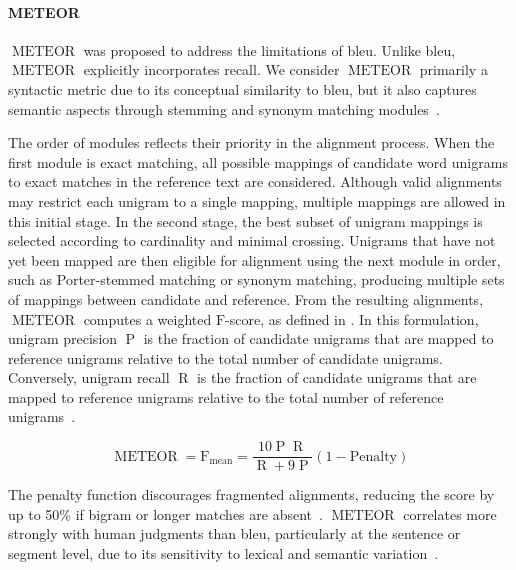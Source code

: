 
\paragraph{METEOR}
$\operatorname{METEOR}$ was proposed to address the limitations of \ac{bleu}. 
Unlike \ac{bleu}, $\operatorname{METEOR}$ explicitly incorporates recall. 
We consider $\operatorname{METEOR}$ primarily a syntactic metric due to its conceptual similarity to \ac{bleu}, but it also captures semantic aspects through stemming and synonym matching modules~\citep{kurt_pehlivanoglu_comparative_2024}. 

The order of modules reflects their priority in the alignment process. 
When the first module is exact matching, all possible mappings of candidate word unigrams to exact matches in the reference text are considered. 
Although valid alignments may restrict each unigram to a single mapping, multiple mappings are allowed in this initial stage. 
In the second stage, the best subset of unigram mappings is selected according to cardinality and minimal crossing. 
Unigrams that have not yet been mapped are then eligible for alignment using the next module in order, such as Porter-stemmed matching or synonym matching, producing multiple sets of mappings between candidate and reference. 
From the resulting alignments, $\operatorname{METEOR}$ computes a weighted $\mathrm{F}$-score, as defined in . 
In this formulation, unigram precision $\operatorname{P}$ is the fraction of candidate unigrams that are mapped to reference unigrams relative to the total number of candidate unigrams. 
Conversely, unigram recall $\operatorname{R}$ is the fraction of candidate unigrams that are mapped to reference unigrams relative to the total number of reference unigrams~\citep{banerjee_METEOR_2005}.

\begin{equation}
    \operatorname{METEOR} = \operatorname{F_{mean}} = \frac{10  \operatorname{P}  \operatorname{R}}{\operatorname{R} + 9  \operatorname{P}}  (1 - \mathrm{Penalty})
\label{eq:meteor}
\end{equation}

The penalty function discourages fragmented alignments, reducing the score by up to 50\% if bigram or longer matches are absent~\citep{banerjee_METEOR_2005}. 
$\operatorname{METEOR}$ correlates more strongly with human judgments than \ac{bleu}, particularly at the sentence or segment level, due to its sensitivity to lexical and semantic variation~\citep{zhou_paraphrase_2021,kurt_pehlivanoglu_comparative_2024}.


